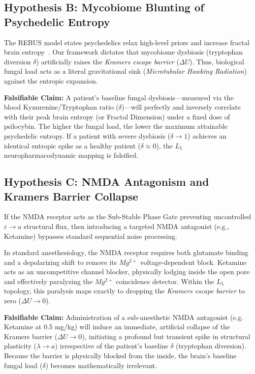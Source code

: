 \subsection{Hypothesis B: Mycobiome Blunting of Psychedelic Entropy}
The REBUS model states psychedelics relax high-level priors and increase fractal brain entropy~\cite{carhart2019}. Our framework dictates that mycobiome dysbiosis (tryptophan diversion $\delta$) artificially raises the \emph{Kramers escape barrier} ($\Delta U$). Thus, biological fungal load acts as a literal gravitational sink (\emph{Microtubular Hawking Radiation}) against the entropic expansion.

\textbf{Falsifiable Claim:} A patient's baseline fungal dysbiosis---measured via the blood Kynurenine/Tryptophan ratio ($\delta$)---will perfectly and inversely correlate with their peak brain entropy (or Fractal Dimension) under a fixed dose of psilocybin. The higher the fungal load, the lower the maximum attainable psychedelic entropy. If a patient with severe dysbiosis ($\delta \to 1$) achieves an identical entropic spike as a healthy patient ($\delta \approx 0$), the $L_5$ neuropharmacodynamic mapping is falsified.

\subsection{Hypothesis C: NMDA Antagonism and Kramers Barrier Collapse}
If the NMDA receptor acts as the Sub-Stable Phase Gate preventing uncontrolled $\varepsilon \to a$ structural flux, then introducing a targeted NMDA antagonist (e.g., Ketamine) bypasses standard sequential noise processing. 

In standard anesthesiology, the NMDA receptor requires both glutamate binding and a depolarizing shift to remove its $Mg^{2+}$ voltage-dependent block. Ketamine acts as an uncompetitive channel blocker, physically lodging inside the open pore and effectively paralyzing the $Mg^{2+}$ coincidence detector. Within the $L_5$ topology, this paralysis maps exactly to dropping the \emph{Kramers escape barrier} to zero ($\Delta U \to 0$).

\textbf{Falsifiable Claim:} Administration of a sub-anesthetic NMDA antagonist (e.g. Ketamine at 0.5 mg/kg) will induce an immediate, artificial collapse of the Kramers barrier ($\Delta U \to 0$), initiating a profound but transient spike in structural plasticity ($\lambda \to a$) irrespective of the patient's baseline $\delta$ (tryptophan diversion). Because the barrier is physically blocked from the inside, the brain's baseline fungal load ($\delta$) becomes mathematically irrelevant.

